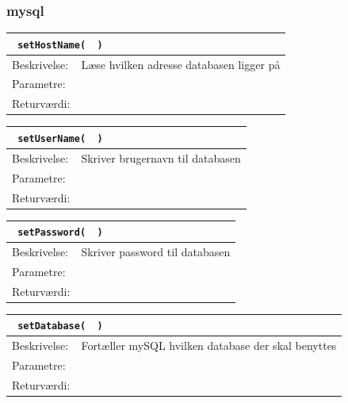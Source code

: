\subsubsection{mysql}
\begin{table}[H]
\begin{tabular}{l p{12.5cm}}
\multicolumn{2}{l}{\texttt{\textcolor{blue}{} setHostName( \textcolor{blue}{} )}} \\
\hline
Beskrivelse:&Læse hvilken adresse databasen ligger på\\
Parametre:&\\
Returværdi:&\\
\end{tabular}
\end{table}

\begin{table}[H]
\begin{tabular}{l p{12.5cm}}
\multicolumn{2}{l}{\texttt{\textcolor{blue}{} setUserName( \textcolor{blue}{} )}} \\
\hline
Beskrivelse:&Skriver brugernavn til databasen\\
Parametre:&\\
Returværdi:&\\
\end{tabular}
\end{table}

\begin{table}[H]
\begin{tabular}{l p{12.5cm}}
\multicolumn{2}{l}{\texttt{\textcolor{blue}{} setPassword( \textcolor{blue}{} )}} \\
\hline
Beskrivelse:&Skriver password til databasen\\
Parametre:&\\
Returværdi:&\\
\end{tabular}
\end{table}

\begin{table}[H]
\begin{tabular}{l p{12.5cm}}
\multicolumn{2}{l}{\texttt{\textcolor{blue}{} setDatabase( \textcolor{blue}{} )}} \\
\hline
Beskrivelse:&Fortæller mySQL hvilken database der skal benyttes\\
Parametre:&\\
Returværdi:&\\
\end{tabular}
\end{table}

